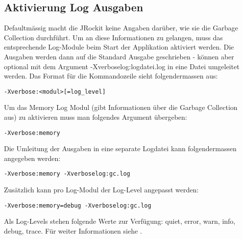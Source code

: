 \subsection{Aktivierung Log Ausgaben}
Defaultmässig macht die JRockit keine Angaben darüber, wie sie die Garbage Collection durchführt. Um an diese Informationen zu gelangen, muss das entsprechende Log-Module beim Start der Applikation aktiviert werden. Die Ausgaben werden dann auf die Standard Ausgabe geschrieben - können aber optional mit dem Argument -Xverboselog:logdatei.log in eine Datei umgeleitet werden. Das Format für die Kommandozeile sieht folgendermassen aus:

\begin{lstlisting}[caption=Format Aktivierung Log Modul]
-Xverbose:<modul>[=log_level]
\end{lstlisting}

Um das Memory Log Modul (gibt Informationen über die Garbage Collection aus) zu aktivieren muss man folgendes Argument übergeben:
\begin{lstlisting}[caption=Garbage Collection Log (Info)]
-Xverbose:memory
\end{lstlisting}

Die Umleitung der Ausgaben in eine separate Logdatei kann folgendermassen angegeben werden:
\begin{lstlisting}[caption=Garbage Collection Log (Info) - Umleitung in gc.log]
-Xverbose:memory -Xverboselog:gc.log 
\end{lstlisting}


Zusätzlich kann pro Log-Modul der Log-Level angepasst werden:
\begin{lstlisting}[caption=Einstellung des Log-Levels]
-Xverbose:memory=debug -Xverboselog:gc.log 
\end{lstlisting}
Als Log-Levels stehen folgende Werte zur Verfügung: quiet, error, warn, info, debug, trace. Für weiter Informationen siehe \cite{oracleJRockitR28CLR}.

